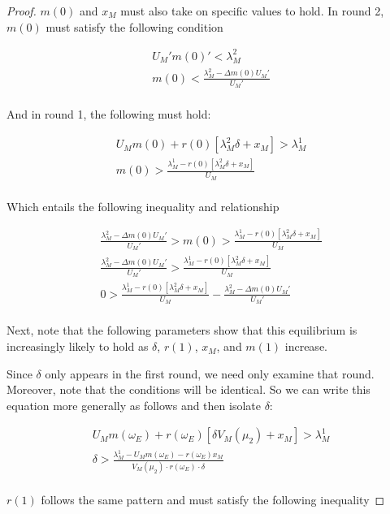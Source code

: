 \documentclass[
  12pt,
]{article}
\theoremstyle{plain}
\theoremstyle{plain}
\theoremstyle{remark}
\begin{document}
\begin{proof}
\(m(0)\) and \(x_M\) must also take on specific values to hold. In round
2, \(m(0)\) must satisfy the following condition

\[
\begin{aligned}
U_M' m(0)' < \lambda^2_M\\
m(0) < \frac{\lambda^2_M - \Delta m(0) U_M'}{U_M'}\\
\end{aligned}
\]

And in round 1, the following must hold:

\[
\begin{aligned}
U_M m(0) + r(0)[\lambda_M^2 \delta + x_M] > \lambda^1_M\\
m(0) > \frac{\lambda_M^1 - r(0)[\lambda_M^2\delta + x_M]}{U_M} \\
\end{aligned}
\]

Which entails the following inequality and relationship

\[
\begin{aligned}
\frac{\lambda_M^2 - \Delta m(0) U_M'}{U_M'}  > m(0) > \frac{\lambda_M^1 - r(0)[\lambda_M^2 \delta + x_M]}{U_M}\\
\frac{\lambda_M^2 - \Delta m(0) U_M'}{U_M'} > \frac{\lambda_M^1 - r(0)[\lambda_M^2 \delta + x_M]}{U_M}\\
0 >  \frac{\lambda_M^1 - r(0)[\lambda_M^2 \delta + x_M]}{U_M} - \frac{\lambda_M^2- \Delta m(0) U_M'}{U_M'}\\
\end{aligned}
\]

Next, note that the following parameters show that this equilibrium is
increasingly likely to hold as \(\delta\), \(r(1)\), \(x_M\), and
\(m(1)\) increase.

Since \(\delta\) only appears in the first round, we need only examine
that round. Moreover, note that the conditions will be identical. So we
can write this equation more generally as follows and then isolate
\(\delta\):

\[
\begin{aligned}
U_M m(\omega_E) + r(\omega_E)[\delta V_M(\mu_2) + x_M] > \lambda_M^1\\
\delta > \frac{\lambda_M^1 - U_M m(\omega_E) - r(\omega_E) x_M}{V_M(\mu_2) \cdot r(\omega_E) \cdot \delta}\\
\end{aligned}
\]

\(r(1)\) follows the same pattern and must satisfy the following
inequality


\end{proof}
\end{document}
